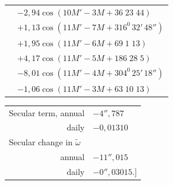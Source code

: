\begin{landscape}
\begin{longtable}{@{}r@{}l@{}}
&\(-2{,}94\cos(10M'-3M+36\;23\;44)\)\\[3pt]
&\(+1{,}13\cos(11M'-7M+316^0\,32'\,48'')\)\\
&\(+1{,}95\cos(11M'-6M+69\;1\;13)\)\\
&\(+4{,}17\cos(11M'-5M+186\;28\;5)\)\\
&\(-8{,}01\cos(11M'-4M+304^0\,25'\,18'')\)\\
&\(-1{,}06\cos(11M'-3M+63\;10\;13)\)
\end{longtable}
\begin{center}
\begin{tabular}{rl}
Secular term, annual&\(-4''{,}787\)\\
daily&\(-0{,}01310\)\\[4pt]
\multicolumn{2}{l}{Secular change in \(\tilde\omega\)}\\[4pt]
annual&\(-11''{,}015\)\\
daily&\(-0''{,}03015\).]
\end{tabular}
\end{center}
\endgroup
\clearpage
\endgroup
\end{landscape}
